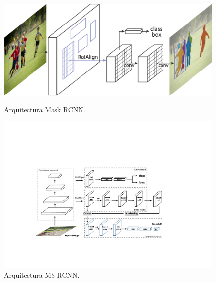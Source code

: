 \begin{figure}[htbp]
    \centering
    \begin{minipage}[b]{0.48\textwidth}
        \centering
    \includegraphics[width=1\textwidth]{figures/Model Mask RCNN.pdf}
    \caption[Arquitectura Mask RCNN]{Arquitectura Mask RCNN.}
    \end{minipage}
    \hfill
    \begin{minipage}[b]{0.48\textwidth}
        \centering
    \includegraphics[width=1\textwidth]{figures/Model Mask Scoring RCNN.pdf}
    \caption[Arquitectura MS RCNN]{Arquitectura MS RCNN.}
    \end{minipage}
\end{figure}

